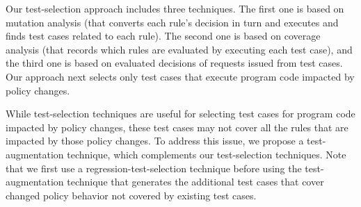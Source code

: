 
Our test-selection approach includes three techniques.
The first one is based on mutation analysis (that converts each rule's decision in turn and executes 
and finds test cases related to each rule). The second one is based on coverage analysis (that records 
which rules are evaluated by executing each test case), and the third one is based on evaluated 
decisions of requests issued from test cases. Our approach next selects only test cases that execute program code impacted by policy changes.

While test-selection techniques are useful for selecting test cases for program code impacted by policy changes, these test cases may not 
cover all the rules that are impacted by those policy changes.
To address this issue, we propose a test-augmentation technique, which complements our test-selection techniques.
Note that we first use a regression-test-selection technique before using the test-augmentation technique that generates the additional test cases 
that cover changed policy behavior not covered by existing test cases.





